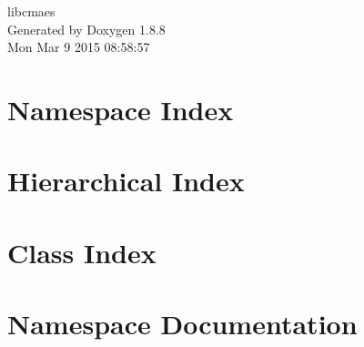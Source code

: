 \documentclass[twoside]{book}
\newcommand{\+}{\discretionary{\mbox{\scriptsize$\hookleftarrow$}}{}{}}
\newcommand{\clearemptydoublepage}{%
  \newpage{\pagestyle{empty}\cleardoublepage}%
}
\begin{document}
\hypersetup{pageanchor=false,
             bookmarks=true,
             bookmarksnumbered=true,
             pdfencoding=unicode
            }
\begin{titlepage}
\vspace*{7cm}
\begin{center}%
{\Large libcmaes }\\
\vspace*{1cm}
{\large Generated by Doxygen 1.8.8}\\
\vspace*{0.5cm}
{\small Mon Mar 9 2015 08:58:57}\\
\end{center}
\end{titlepage}
\clearemptydoublepage
\tableofcontents
\clearemptydoublepage
{}
\hypersetup{pageanchor=true}

\chapter{Namespace Index}

\chapter{Hierarchical Index}

\chapter{Class Index}

\chapter{Namespace Documentation}


\end{document}
